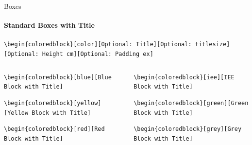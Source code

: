 \documentclass[aspectratio=169]{beamer}
\begin{document}
\begin{frame}{Boxes}
    \framesubtitle{Standard Boxes with Title}

    \begin{coloredblock}[grey]
        \footnotesize\centering\texttt{\textbackslash begin\{coloredblock\}[color][Optional:~Title][Optional:~titlesize][Optional:~Height cm][Optional:~Padding ex]}
    \end{coloredblock}

    \vspace{-1.1cm}
    \begin{columns}
        \begin{column}{0.49\textwidth}
    
            \begin{coloredblock}
                \footnotesize\texttt{\textbackslash begin\{coloredblock\}[blue][Blue Block with Title]}\strut
            \end{coloredblock}
    
            \begin{coloredblock}
                \footnotesize\texttt{\textbackslash begin\{coloredblock\}[yellow][Yellow Block with Title]}\strut
            \end{coloredblock}

            \begin{coloredblock}
                \footnotesize\texttt{\textbackslash begin\{coloredblock\}[red][Red Block with Title]}\strut
            \end{coloredblock}
        
        \end{column}
        \begin{column}{0.49\textwidth}
    
            \begin{coloredblock}
                \footnotesize\texttt{\textbackslash begin\{coloredblock\}[iee][IEE Block with Title]}\strut
            \end{coloredblock}
    
            \begin{coloredblock}
                \footnotesize\texttt{\textbackslash begin\{coloredblock\}[green][Green Block with Title]}\strut
            \end{coloredblock}
    
            \begin{coloredblock}
                \footnotesize\texttt{\textbackslash begin\{coloredblock\}[grey][Grey Block with Title]}\strut
            \end{coloredblock}
        \end{column}
    \end{columns}

\end{frame}
\end{document}
